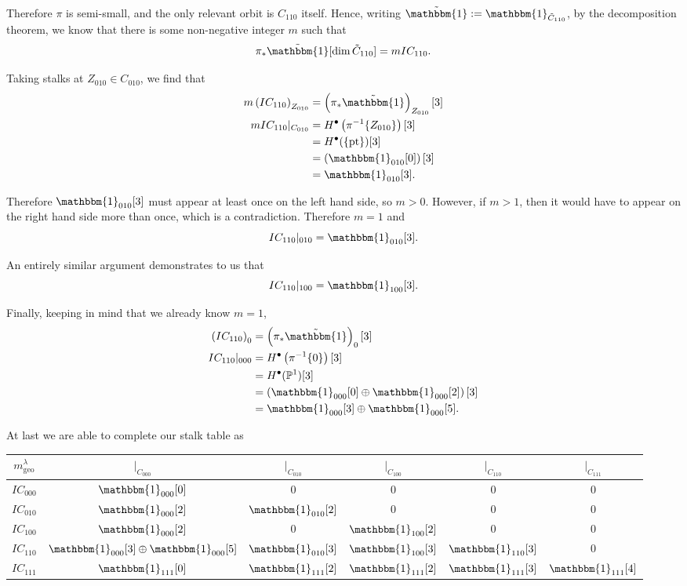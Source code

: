 \documentclass{memoir}
\newcommand{\mb}{\mathbb}
\newcommand{\lb}{\left(}
\newcommand{\rb}{\right)}
\newcommand{\tx}{\text}
\theoremstyle{definition}
\begin{document}
	Therefore $\pi$ is semi-small, and the only relevant orbit is $C_{110}$ itself.  
	Hence, writing $\tilde{\mathbbm{1}}:=\mathbbm{1}_{\tilde{C}_{110}}$, by the decomposition theorem, we know that there is some non-negative integer $m$ such that 
	$$\pi_\ast\tilde{\mathbbm{1}}[\dim\tilde{C}_{110}]=m IC_{110}.$$
	
	Taking stalks at $Z_{010}\in C_{010}$, we find that 
	\begin{align*}
		m\lb IC_{110}\rb_{Z_{010}}&=\lb\pi_\ast\tilde{\mathbbm{1}}\rb_{Z_{010}}[3]\\ 
		mIC_{110}|_{C_{010}}&=H^\bullet\lb\pi^{-1}\{Z_{010}\}\rb[3]\\
		&=H^\bullet(\{\tx{pt}\})[3]\\
		&=\lb\mathbbm{1}_{010}[0]\rb[3]\\
		&=\mathbbm{1}_{010}[3].
	\end{align*}
	
	Therefore $\mathbbm{1}_{010}[3]$ must appear at least once on the left hand side, so $m>0$.  
	However, if $m>1$, then it would have to appear on the right hand side more than once, which is a contradiction.  
	Therefore $m=1$ and 
	$$IC_{110}|_{010}=\mathbbm{1}_{010}[3].$$
	
	An entirely similar argument demonstrates to us that 
	$$IC_{110}|_{100}=\mathbbm{1}_{100}[3].$$
	
	Finally, keeping in mind that we already know $m=1$,
		\begin{align*}
		\lb IC_{110}\rb_0&=\lb\pi_\ast\tilde{\mathbbm{1}}\rb_0[3]\\ 
			IC_{110}|_{000}&=H^\bullet\lb\pi^{-1}\{0\}\rb[3]\\
			&=H^\bullet(\mb{P}^1)[3]\\
			&=\lb\mathbbm{1}_{000}[0]\oplus\mathbbm{1}_{000}[2]\rb[3]\\
			&=\mathbbm{1}_{000}[3]\oplus\mathbbm{1}_{000}[5].
		\end{align*}
	
	At last we are able to complete our stalk table as
	\begin{center}
		\begin{tabular}{ c | c c c c c}
			$m_{\tx{geo}}^\lambda$ & $|_{C_{000}}$ & $|_{C_{010}}$ & $|_{C_{100}}$ & $|_{C_{110}}$ & $|_{C_{111}}$ \\
			\hline 
			$IC_{000}$ & $\mathbbm{1}_{000}[0]$ & 0 & 0 & 0 & 0\\
			$IC_{010}$ & $\mathbbm{1}_{000}[2]$ & $\mathbbm{1}_{010}[2]$ & 0 & 0 & 0 \\
			$IC_{100}$ & $\mathbbm{1}_{000}[2]$ & 0 & $\mathbbm{1}_{100}[2]$ & 0 & 0 \\
			$IC_{110}$ & $\mathbbm{1}_{000}[3]\oplus\mathbbm{1}_{000}[5]$ & $\mathbbm{1}_{010}[3]$ & $\mathbbm{1}_{100}[3]$ & $\mathbbm{1}_{110}[3]$ & 0 \\
			$IC_{111}$ & $\mathbbm{1}_{111}[0]$ & $\mathbbm{1}_{111}[2]$ & $\mathbbm{1}_{111}[2]$ & $\mathbbm{1}_{111}[3]$ & $\mathbbm{1}_{111}[4]$ \\
		\end{tabular}
	\end{center}
	
\end{document}
